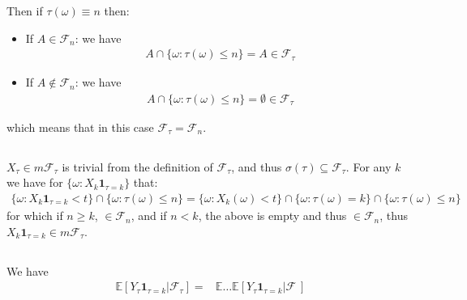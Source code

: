\documentclass[11pt,a4paper]{ctexart}
\numberwithin{equation}{section}%
\newcommand{\F}{\mathcal{F}}
\begin{document}
Then if $ \tau(\omega )\equiv n $ then:
\begin{itemize}[topsep=2pt,itemsep=0pt]
    \item If $ A\in \F_n$: we have
    \begin{align*}
        A\cap \{\omega : \tau(\omega )\leq n\} = A \in \F_\tau 
    \end{align*}
    \item If $ A\not\in \F_n$: we have
    \begin{align*}
        A\cap \{\omega : \tau(\omega )\leq n\} = \emptyset \in \F_\tau  
    \end{align*}
\end{itemize}
which means that in this case $ \F_\tau =\F_n $.

\subsection{}

$ X_\tau \in m\F_\tau $ is trivial from the definition of $ \F_\tau $, and thus $ \sigma (\tau)\subseteq \F_\tau $. For any $ k $ we have for $ \{\omega : X_k\mathbf{1}_{\tau = k} \}$ that: 
\begin{align*}
     \{\omega : X_k\mathbf{1}_{\tau = k} <t \} \cap \{\omega : \tau(\omega )\leq n\} = \{\omega : X_k(\omega ) < t \} \cap \{\omega : \tau(\omega ) = k\} \cap \{\omega : \tau(\omega )\leq n\} 
\end{align*}
for which if $ n\geq k $, $ \in \F_n $, and if $ n<k $, the above is empty and thus $ \in \F_n $, thus $ X_k\mathbf{1}_{\tau = k} \in m\F_\tau $.


\subsection{}

We have
\begin{align*}
    \mathbb{E}\left[ Y_\tau \mathbf{1}_{\tau =k}|\F_\tau \right] = & \mathbb{E}\ldots \mathbb{E}\left[ Y_\tau \mathbf{1}_{\tau =k}|\F_\ \right] 
\end{align*}






 


    


    








    
\end{document}
